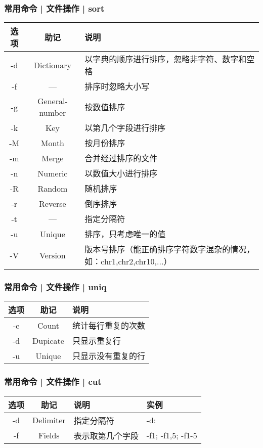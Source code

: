 \begin{frame}
  \frametitle{常用命令 | 文件操作 | \alert{sort}}
  \begin{table}
    \centering
    \begin{tabularx}{0.9\textwidth}{ccX}
      \hline
      \rowcolor{blue!50}选项 & 助记 & 说明\\
      \hline
      -d & Dictionary & 以字典的顺序进行排序，忽略非字符、数字和空格\\
      -f & --- & 排序时忽略大小写\\
      -g & General-number & 按数值排序\\
      -k & Key & 以第几个字段进行排序\\
      -M & Month & 按月份排序\\
      -m & Merge & 合并经过排序的文件\\
      -n & Numeric & 以数值大小进行排序\\
      -R & Random & 随机排序\\
      -r & Reverse & 倒序排序\\
      -t & --- & 指定分隔符\\
      -u & Unique & 排序，只考虑唯一的值\\
      -V & Version & 版本号排序（能正确排序字符数字混杂的情况，如：chr1,chr2,chr10,...）\\
      \hline
    \end{tabularx}
  \end{table}
\end{frame}

\begin{frame}
  \frametitle{常用命令 | 文件操作 | \alert{uniq}}
  \begin{table}
    \centering
    \begin{tabularx}{0.9\textwidth}{ccX}
      \hline
      \rowcolor{blue!50}选项 & 助记 & 说明\\
      \hline
      -c & Count & 统计每行重复的次数\\
      -d & Dupicate & 只显示重复行\\
      -u & Unique & 只显示没有重复的行\\
      \hline
    \end{tabularx}
  \end{table}
\end{frame}

\begin{frame}
  \frametitle{常用命令 | 文件操作 | \alert{cut}}
  \begin{table}
    \centering
    \begin{tabularx}{0.9\textwidth}{cclX}
      \hline
      \rowcolor{blue!50}选项 & 助记 & 说明 & 实例\\
      \hline
      -d & Delimiter & 指定分隔符 & -d:\\
      -f & Fields & 表示取第几个字段 & -f1; -f1,5; -f1-5\\
      \hline
    \end{tabularx}
  \end{table}
\end{frame}

